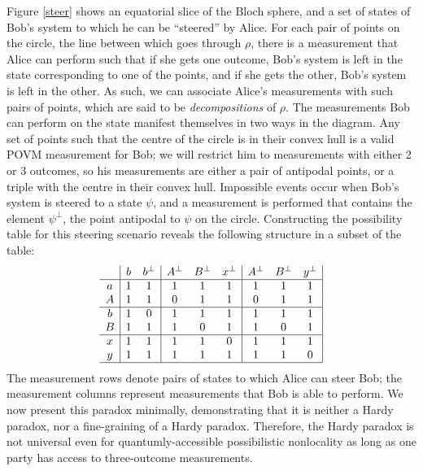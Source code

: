 \documentclass[reprint]{revtex4-1}
\theoremstyle{definition}
\begin{document}
Figure \ref{steer} shows an equatorial slice of the Bloch sphere, and a set of states of Bob's system to which he can be ``steered'' by Alice. For each pair of points on the circle, the line between which goes through $\rho$, there is a measurement that Alice can perform such that if she gets one outcome, Bob's system is left in the state corresponding to one of the points, and if she gets the other, Bob's system is left in the other. As such, we can associate Alice's measurements with such pairs of points, which are said to be \emph{decompositions} of $\rho$. The measurements Bob can perform on the state manifest themselves in two ways in the diagram. Any set of points such that the centre of the circle is in their convex hull is a valid POVM measurement for Bob; we will restrict him to measurements with either 2 or 3 outcomes, so his measurements are either a pair of antipodal points, or a triple with the centre in their convex hull. Impossible events occur when Bob's system is steered to a state $\psi$, and a measurement is performed that contains the element $\psi^\perp$, the point antipodal to $\psi$ on the circle. Constructing the possibility table for this steering scenario reveals the following structure in a subset of the table:
\begin{equation*}
\begin{array}{ c  | c c | c c c| c c c|}\
  & b&b^\perp& A^\perp &B^\perp&x^\perp& A^\perp &B^\perp&y^\perp \\ \hline
  a &1&1&1&1&1&1&1&1\\ 
  A &1&1&0&1&1&0&1&1\\ \hline
  b &1&0&1&1&1&1&1&1\\ 
 B  &1&1&1&0&1&1&0&1\\ \hline
 x &1&1&1&1&0&1&1&1\\ 
 y &1&1&1&1&1&1&1&0\\ \hline
\end{array}
\end{equation*}
The measurement rows denote pairs of states to which Alice can steer Bob; the measurement columns represent measurements that Bob is able to perform.
We now present this paradox minimally, demonstrating that it is neither a Hardy paradox, nor a fine-graining of a Hardy paradox. Therefore, the Hardy paradox is not universal even for quantumly-accessible possibilistic nonlocality as long as one party has access to three-outcome measurements. 
\end{document}
